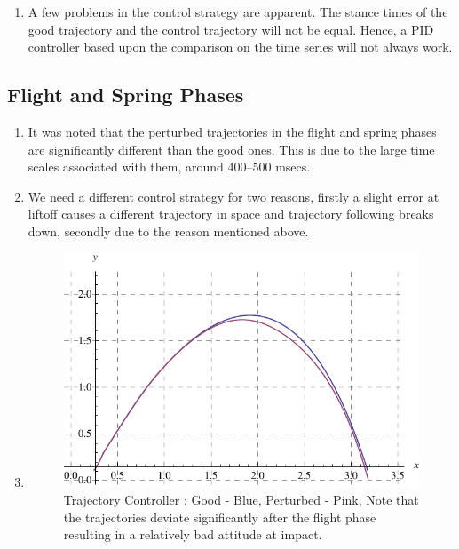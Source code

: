\begin{enumerate}
  \item
  A few problems in the control strategy are apparent. The stance times of the good trajectory and the 
  control trajectory will not be equal. Hence, a PID controller based upon the comparison on the time 
  series will not always work.
\end{enumerate}

\subsection*{Flight and Spring Phases}
\begin{enumerate}
  \item
  It was noted that the perturbed trajectories in the flight and spring phases are significantly different than the good ones. This is due to the large time scales associated with them, around 400--500 msecs.
  \item
  We need a different control strategy for two reasons, firstly a slight error at liftoff causes a different trajectory in space and trajectory following breaks down, secondly due to the reason mentioned above.
  \item
  \begin{figure}[H]
  \centering
  \includegraphics[scale=1.1]{fig/pFullTrajec_control.pdf}
  \caption[Trajectory Controller : Good - Blue, Perturbed - Pink]{Trajectory Controller : Good - Blue, Perturbed - Pink, Note that the trajectories deviate significantly after the flight phase resulting in a relatively bad attitude at impact.}
  \label{fig:4_full_trajec_control}
  \end{figure}


\end{enumerate}
